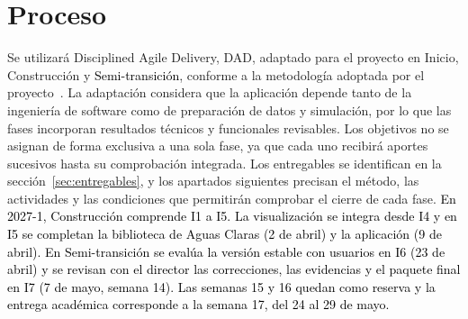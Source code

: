 \clearpage
\section{Proceso}\label{sec:proceso}
Se utilizará Disciplined Agile Delivery, DAD, adaptado para el proyecto en Inicio, Construcción y \textcolor{black}{Semi-transición}, conforme a la metodología adoptada por el proyecto~\cite{poster2026}. La adaptación considera que la aplicación depende tanto de la ingeniería de software como de preparación de datos y simulación, por lo que las fases incorporan resultados técnicos y funcionales revisables. Los objetivos no se asignan de forma exclusiva a una sola fase, ya que cada uno recibirá aportes sucesivos hasta su comprobación integrada. Los entregables se identifican en la sección~\ref{sec:entregables}, y los apartados siguientes precisan el método, las actividades y las condiciones que permitirán comprobar el cierre de cada fase.
\textcolor{black}{En 2027-1, Construcción comprende I1 a I5. La visualización se integra desde I4 y en I5 se completan la biblioteca de Aguas Claras (2 de abril) y la aplicación (9 de abril). En Semi-transición se evalúa la versión estable con usuarios en I6 (23 de abril) y se revisan con el director las correcciones, las evidencias y el paquete final en I7 (7 de mayo, semana 14). Las semanas 15 y 16 quedan como reserva y la entrega académica corresponde a la semana 17, del 24 al 29 de mayo.}



